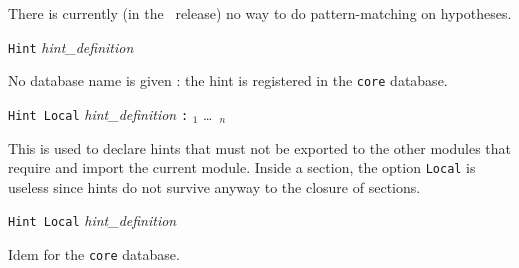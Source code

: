 \Rem There is currently (in the \coqversion\ release) no way to do
pattern-matching on hypotheses.

\begin{Variants}
\item \texttt{Hint} \textsl{hint\_definition} 
  
  No database name is given : the hint is registered in the {\tt core} 
    database. 

\item\texttt{Hint Local} \textsl{hint\_definition} \texttt{:}
   \ident$_1$ \ldots\ \ident$_n$

  This is used to declare hints that must not be exported to the other
  modules that require and import the current module. Inside a
  section, the option {\tt Local} is useless since hints do not
  survive anyway to the closure of sections.

\item\texttt{Hint Local} \textsl{hint\_definition} 

  Idem for the {\tt core} database.
    
\end{Variants}






